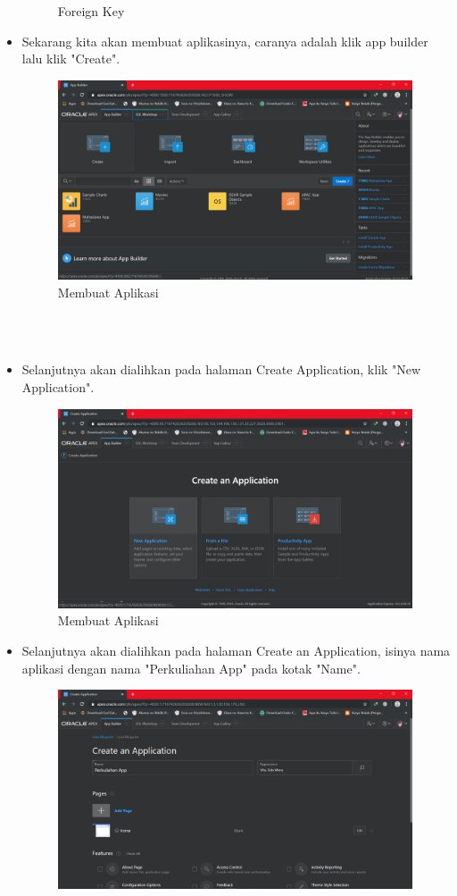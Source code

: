 \documentclass[12pt, times new roman]{article}
\begin{document}
\begin{itemize}
\begin{figure}[htbp]
	\caption{Foreign Key}
\end{figure}
\item Sekarang kita akan membuat aplikasinya, caranya adalah klik app builder lalu klik "Create".
\begin{figure}[htbp]
	\centering
	\includegraphics[width=10.5cm]{figures/Screenshot_12.png}
	\caption{Membuat Aplikasi}
\end{figure}\\
\\
\item Selanjutnya akan dialihkan pada halaman Create Application, klik "New Application".
\begin{figure}[htbp]
	\centering
	\includegraphics[width=10.5cm]{figures/Screenshot_13.png}
	\caption{Membuat Aplikasi}
\end{figure}
\item Selanjutnya akan dialihkan pada halaman Create an Application, isinya nama aplikasi dengan nama "Perkuliahan App" pada kotak "Name".
\begin{figure}[htbp]
	\centering
	\includegraphics[width=10.5cm]{figures/Screenshot_14.png}

\end{figure}
\end{itemize}
\end{document}
